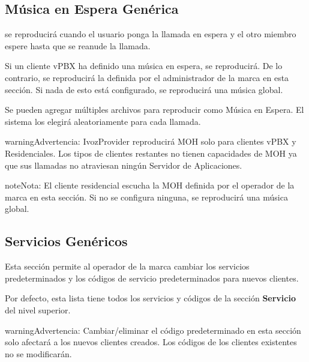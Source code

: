 \documentclass[letterpaper,10pt,spanish]{sphinxmanual}
\begin{document}
\subsection{Música en Espera Genérica}
\label{administration_portal/brand/settings/generic_music_on_hold:generic-music-on-hold}\label{administration_portal/brand/settings/generic_music_on_hold::doc}
{\hyperref[administration_portal/client/vpbx/multimedia/music_on_hold:music\string-on\string-hold]{}} se reproducirá cuando el usuario ponga la llamada en espera y el otro miembro espere hasta que se reanude la llamada.

Si un cliente vPBX ha definido una música en espera, se reproducirá. De lo contrario, se reproducirá la definida por el administrador de la marca en esta sección. Si nada de esto está configurado, se reproducirá una música global.

Se pueden agregar múltiples archivos para reproducir como Música en Espera. El sistema los elegirá aleatoriamente para cada llamada.

\begin{notice}{warning}{Advertencia:}
IvozProvider reproducirá MOH solo para clientes vPBX y Residenciales. Los tipos de clientes restantes no tienen capacidades de MOH ya que sus llamadas no atraviesan ningún Servidor de Aplicaciones.
\end{notice}

\begin{notice}{note}{Nota:}
El cliente residencial escucha la MOH definida por el operador de la marca en esta sección. Si no se configura ninguna, se reproducirá una música global.
\end{notice}


\subsection{Servicios Genéricos}
\label{administration_portal/brand/settings/generic_services:generic-services}\label{administration_portal/brand/settings/generic_services::doc}\label{administration_portal/brand/settings/generic_services:brand-services}
Esta sección permite al operador de la marca cambiar los servicios predeterminados y los códigos de servicio predeterminados para nuevos clientes.

Por defecto, esta lista tiene todos los servicios y códigos de la sección \textbf{Servicio} del nivel superior.

\begin{notice}{warning}{Advertencia:}
Cambiar/eliminar el código predeterminado en esta sección solo afectará a los nuevos clientes creados. Los códigos de los clientes existentes no se modificarán.
\end{notice}
\end{document}
